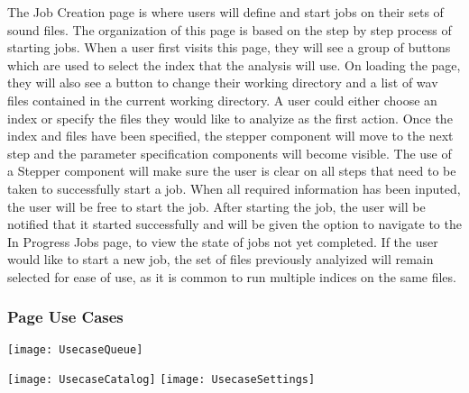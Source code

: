 \begin{samepage}
The Job Creation page is where users will define and start jobs on their sets of sound files. The organization of this page is based on the step by step process of starting jobs. When a user first visits this page, they will see a group of buttons which are used to select the index that the analysis will use. On loading the page, they will also see a button to change their working directory and a list of wav files contained in the current working directory. A user could either choose an index or specify the files they would like to analyize as the first action. Once the index and files have been specified, the stepper component will move to the next step and the parameter specification components will become visible. The use of a Stepper component will make sure the user is clear on all steps that need to be taken to successfully start a job. When all required information has been inputed, the user will be free to start the job. After starting the job, the user will be notified that it started successfully and will be given the option to navigate to the In Progress Jobs page, to view the state of jobs not yet completed. If the user would like to start a new job, the set of files previously analyized will remain selected for ease of use, as it is common to run multiple indices on the same files.
\nopagebreak
\subsubsection{Page Use Cases}
\texttt{[image: UsecaseQueue]}
\end{samepage}
\texttt{[image: UsecaseCatalog]}
\texttt{[image: UsecaseSettings]}

